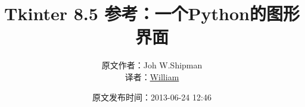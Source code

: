 \title{\huge \textbf{\textsf{Tkinter 8.5 参考：一个Python的图形界面}}}
\author{原文作者：\textsf{Joh W.Shipman}\\译者：\href{mailto:william0victor@gmail.com}{\textsf{William}}}
\date{原文发布时间：\textsf{2013-06-24 12:46}}
\linespread{1}
\maketitle
